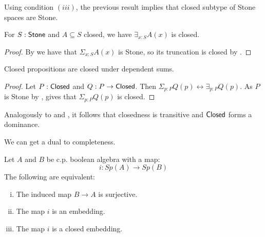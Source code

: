 
\begin{remark}\label{ClosedInStoneIsStone}
Using condition $(iii)$, the previous result implies that closed subtype of Stone spaces are Stone.
\end{remark}

\begin{corollary}\label{InhabitedClosedSubSpaceClosed}
  For $S:\mathsf{Stone}$ and $A\subseteq S$ closed, we have 
  $\exists_{x:S} A(x)$ is closed. 
\end{corollary}
\begin{proof}
  By  we have that $\Sigma_{x:S}A(x)$ is Stone, so its truncation is closed by .
\end{proof}

\begin{corollary}\label{ClosedDependentSums}
  Closed propositions are closed under dependent sums. 
\end{corollary}
\begin{proof}
  Let $P:\mathsf{Closed}$ and $Q:P \to \mathsf{Closed}$. 
  Then $\Sigma_{p:P} Q(p) \leftrightarrow \exists_{p:P} Q(p)$.
  As $P$ is Stone by , 
   gives that $\Sigma_{p:P} Q(p)$ is closed. 
\end{proof}
\begin{remark}
  Analogously to  and , it follows that 
  closedness is transitive and $\mathsf{Closed}$ forms a dominance. 
\end{remark}

We can get a dual to completeness.

\begin{lemma}\label{DualCompleteness}
Let $A$ and $B$ be c.p. boolean algebra with a map:
\[i:Sp(A)\to Sp(B)\] 
The following are equivalent:
\begin{enumerate}[(i)]
\item The induced map $B\to A$ is surjective.
\item The map $i$ is an embedding.
\item The map $i$ is a closed embedding.
\end{enumerate}
\end{lemma}


